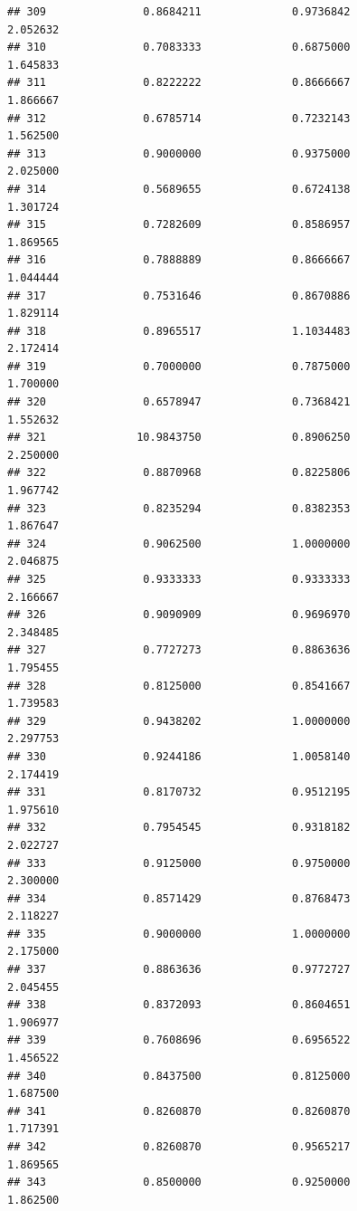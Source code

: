 \documentclass[]{article}
\begin{document}
\begin{verbatim}
## 309               0.8684211              0.9736842               2.052632
## 310               0.7083333              0.6875000               1.645833
## 311               0.8222222              0.8666667               1.866667
## 312               0.6785714              0.7232143               1.562500
## 313               0.9000000              0.9375000               2.025000
## 314               0.5689655              0.6724138               1.301724
## 315               0.7282609              0.8586957               1.869565
## 316               0.7888889              0.8666667               1.044444
## 317               0.7531646              0.8670886               1.829114
## 318               0.8965517              1.1034483               2.172414
## 319               0.7000000              0.7875000               1.700000
## 320               0.6578947              0.7368421               1.552632
## 321              10.9843750              0.8906250               2.250000
## 322               0.8870968              0.8225806               1.967742
## 323               0.8235294              0.8382353               1.867647
## 324               0.9062500              1.0000000               2.046875
## 325               0.9333333              0.9333333               2.166667
## 326               0.9090909              0.9696970               2.348485
## 327               0.7727273              0.8863636               1.795455
## 328               0.8125000              0.8541667               1.739583
## 329               0.9438202              1.0000000               2.297753
## 330               0.9244186              1.0058140               2.174419
## 331               0.8170732              0.9512195               1.975610
## 332               0.7954545              0.9318182               2.022727
## 333               0.9125000              0.9750000               2.300000
## 334               0.8571429              0.8768473               2.118227
## 335               0.9000000              1.0000000               2.175000
## 337               0.8863636              0.9772727               2.045455
## 338               0.8372093              0.8604651               1.906977
## 339               0.7608696              0.6956522               1.456522
## 340               0.8437500              0.8125000               1.687500
## 341               0.8260870              0.8260870               1.717391
## 342               0.8260870              0.9565217               1.869565
## 343               0.8500000              0.9250000               1.862500

\end{verbatim}
\end{document}

